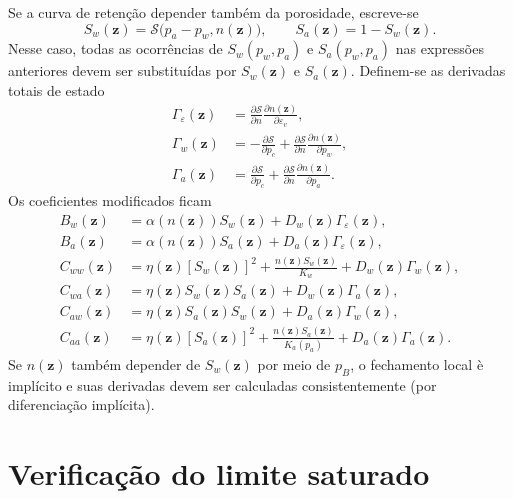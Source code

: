 \documentclass[11pt,a4paper]{article}
\numberwithin{equation}{section}
\begin{document}
Se a curva de reten\c{c}\~ao depender tamb\'em da porosidade, escreve-se
\begin{equation}
\boxed{S_w(\mathbf z)=\mathcal S\bigl(p_a-p_w,n(\mathbf z)\bigr),
\qquad S_a(\mathbf z)=1-S_w(\mathbf z).}
\end{equation}
Nesse caso, todas as ocorr\^encias de $S_w(p_w,p_a)$ e
$S_a(p_w,p_a)$ nas express\~oes anteriores devem ser substitu\'idas
por $S_w(\mathbf z)$ e $S_a(\mathbf z)$. Definem-se as derivadas totais
de estado
\begin{align}
\Gamma_{\varepsilon}(\mathbf z)
&=\frac{\partial\mathcal S}{\partial n}
\frac{\partial n(\mathbf z)}{\partial\varepsilon_v},\\
\Gamma_w(\mathbf z)
&=-\frac{\partial\mathcal S}{\partial p_c}
+\frac{\partial\mathcal S}{\partial n}
\frac{\partial n(\mathbf z)}{\partial p_w},\\
\Gamma_a(\mathbf z)
&=\frac{\partial\mathcal S}{\partial p_c}
+\frac{\partial\mathcal S}{\partial n}
\frac{\partial n(\mathbf z)}{\partial p_a}.
\end{align}
Os coeficientes modificados ficam
\begin{equation}
\boxed{\begin{aligned}
B_w(\mathbf z)&=\alpha(n(\mathbf z))S_w(\mathbf z)
+D_w(\mathbf z)\Gamma_{\varepsilon}(\mathbf z),\\
B_a(\mathbf z)&=\alpha(n(\mathbf z))S_a(\mathbf z)
+D_a(\mathbf z)\Gamma_{\varepsilon}(\mathbf z),\\
C_{ww}(\mathbf z)&=\eta(\mathbf z)[S_w(\mathbf z)]^2
+\frac{n(\mathbf z)S_w(\mathbf z)}{K_w}
+D_w(\mathbf z)\Gamma_w(\mathbf z),\\
C_{wa}(\mathbf z)&=\eta(\mathbf z)S_w(\mathbf z)S_a(\mathbf z)
+D_w(\mathbf z)\Gamma_a(\mathbf z),\\
C_{aw}(\mathbf z)&=\eta(\mathbf z)S_a(\mathbf z)S_w(\mathbf z)
+D_a(\mathbf z)\Gamma_w(\mathbf z),\\
C_{aa}(\mathbf z)&=\eta(\mathbf z)[S_a(\mathbf z)]^2
+\frac{n(\mathbf z)S_a(\mathbf z)}{K_a(p_a)}
+D_a(\mathbf z)\Gamma_a(\mathbf z).
\end{aligned}}
\end{equation}
Se $n(\mathbf z)$ tamb\'em depender de $S_w(\mathbf z)$ por meio de
$p_B$, o fechamento local \`e impl\'icito e suas derivadas devem ser
calculadas consistentemente (por diferencia\c{c}\~ao impl\'icita).

\section{Verifica\c{c}\~ao do limite saturado}
\end{document}
